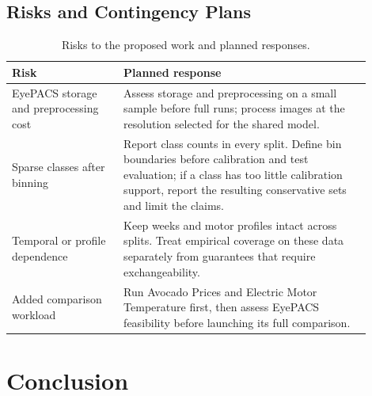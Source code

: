\documentclass[12pt]{report}
\begin{document}
\section{Risks and Contingency Plans}

\begin{table}[ht]
    \centering
    \small
    \caption{Risks to the proposed work and planned responses.}
    \label{tab:project-risks}
    \begin{tabular}{p{0.28\linewidth}p{0.62\linewidth}}
        \toprule
        Risk & Planned response \\
        \midrule
        EyePACS storage and preprocessing cost &
        Assess storage and preprocessing on a small sample before full runs;
        process images at the resolution selected for the shared model. \\
        Sparse classes after binning &
        Report class counts in every split. Define bin boundaries before
        calibration and test evaluation; if a class has too little calibration
        support, report the resulting conservative sets and limit the claims. \\
        Temporal or profile dependence &
        Keep weeks and motor profiles intact across splits. Treat empirical
        coverage on these data separately from guarantees that require
        exchangeability. \\
        Added comparison workload &
        Run Avocado Prices and Electric Motor Temperature first, then assess
        EyePACS feasibility before launching its full comparison. \\
        \bottomrule
    \end{tabular}
\end{table}

\chapter{Conclusion}
\label{chap:conclusion}




\end{document}
